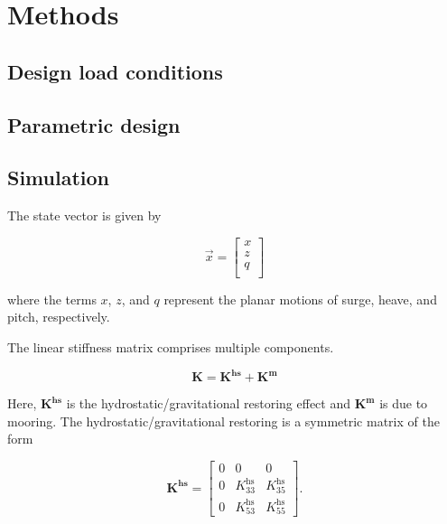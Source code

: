 \documentclass[12pt]{article}
\begin{document}
\section{Methods}\label{sec:methods}

\subsection{Design load conditions}\label{sub:design_load_conditions}

\subsection{Parametric design}\label{sub:parametric_design}

\subsection{Simulation}\label{sub:simulation}

The state vector is given by 

\begin{equation}
	\vec{x} = \begin{bmatrix}
	x \\
	z \\
	q \\
	\end{bmatrix}
\end{equation}

\noindent{}where the terms $x$, $z$, and $q$ represent the planar motions of surge, heave, and pitch, respectively.

The linear stiffness matrix comprises multiple components.

\begin{equation}
	\bm{K} = \bm{K^{\textrm{hs}}} + \bm{K^{\textrm{m}}}
\end{equation}

\noindent{}Here, $\bm{K^{\textrm{hs}}}$ is the hydrostatic/gravitational restoring effect and $\bm{K^{\textrm{m}}}$ is due to mooring.
The hydrostatic/gravitational restoring is a symmetric matrix of the form

\begin{equation}\label{eq:hsStiffness}
	\bm{K^{\textrm{hs}}} = \begin{bmatrix}
	0 & 0 & 0 \\
	0 & K^{\textrm{hs}}_{33} & K^{\textrm{hs}}_{35} \\
	0 & K^{\textrm{hs}}_{53} & K^{\textrm{hs}}_{55} 
	\end{bmatrix} .
\end{equation}
\end{document}
